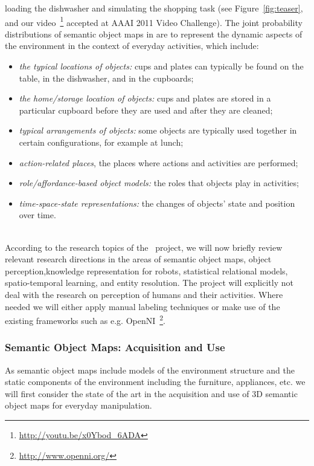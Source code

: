loading  the  dishwasher and simulating the shopping task (see Figure~\ref{fig:teaser}, and 
our video~\footnote{\url{http://youtu.be/x0Ybod_6ADA}} accepted at AAAI 2011 Video Challenge).
The joint probability distributions of semantic object maps in \ksem are to represent the
dynamic aspects of the environment in the context of everyday
activities, which include:
\begin{itemize}
\item \emph{the typical locations of objects:} cups and plates can
  typically be found on the table, in the dishwasher, and in the
  cupboards;
\item \emph{the home/storage location of objects:} cups and plates are
  stored in a particular cupboard before they are used and after they
  are cleaned;
\item \emph{typical arrangements of objects:} some objects are
  typically used together in certain configurations, for example
  at lunch; %
\item \emph{action-related places}, the places where actions and
  activities are performed;
\item \emph{role/affordance-based object models:} the roles that
  objects play in activities;
\item \emph{time-space-state representations:} the changes of
  objects' state and position over time.
\end{itemize}

\\
According to the research topics of the \ksem\ project, we will now
briefly review relevant research directions in the areas of semantic
object maps, object perception,knowledge representation for robots, statistical relational models,
spatio-temporal learning, and entity resolution. The project will
explicitly not deal with the research on perception of humans and their activities.
Where needed we will either apply manual labeling techniques or make use 
of the existing frameworks such as e.g. OpenNI~\footnote{\url{http://www.openni.org/}}.
\subsubsection{Semantic Object Maps: Acquisition and Use}
\label{sec:soms}
As semantic object maps include models of the environment structure and the static
components of the environment including the furniture, appliances,
etc. we will first consider the state of the art in the acquisition
and use of 3D semantic object maps for everyday manipulation.

